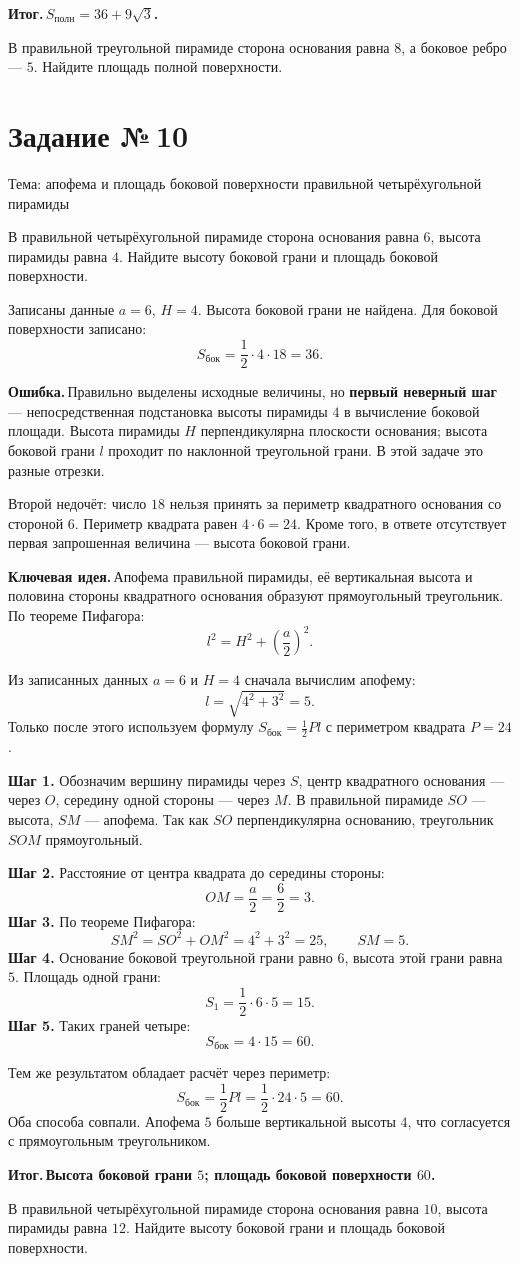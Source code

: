 \documentclass[a4paper,12pt]{article}
\newcommand{\keyidea}{\textcolor{darkaccent}{\textbf{Ключевая идея.}}\,}
\newcommand{\errorlead}{\textcolor{alert}{\textbf{Ошибка.}}\,}
\newcommand{\outcome}{\textcolor{darkaccent}{\textbf{Итог.}}\,}
\newcommand{\parthead}[1]{\par\vspace{4pt}{\bfseries\textcolor{ink}{#1}}\par\vspace{1pt}}
\newcommand{\taskhead}[2]{\phantomsection\label{task:#1}\section*{Задание №\,#1}\textcolor{muted}{#2}\par\smallskip}
\begin{document}
\outcome \textbf{$S_{\text{полн}}=36+9\sqrt3$.}

\parthead{Задача на закрепление}
В правильной треугольной пирамиде сторона основания равна $8$, а боковое ребро --- $5$. Найдите площадь полной поверхности.

\newpage
\taskhead{10}{Тема: апофема и площадь боковой поверхности правильной четырёхугольной пирамиды}
\parthead{Условие}
В правильной четырёхугольной пирамиде сторона основания равна $6$, высота пирамиды равна $4$. Найдите высоту боковой грани и площадь боковой поверхности.

\parthead{Ваше решение и ответ}
Записаны данные $a=6$, $H=4$. Высота боковой грани не найдена. Для боковой поверхности записано:
\[
S_{\text{бок}}=\frac12\cdot4\cdot18=36.
\]

\parthead{Где возникает ошибка}
\errorlead Правильно выделены исходные величины, но \textbf{первый неверный шаг} --- непосредственная подстановка высоты пирамиды $4$ в вычисление боковой площади. Высота пирамиды $H$ перпендикулярна плоскости основания; высота боковой грани $l$ проходит по наклонной треугольной грани. В этой задаче это разные отрезки.

Второй недочёт: число $18$ нельзя принять за периметр квадратного основания со стороной $6$. Периметр квадрата равен $4\cdot6=24$. Кроме того, в ответе отсутствует первая запрошенная величина --- высота боковой грани.

\parthead{Ключевая идея}
\keyidea Апофема правильной пирамиды, её вертикальная высота и половина стороны квадратного основания образуют прямоугольный треугольник. По теореме Пифагора:
\[
l^2=H^2+\left(\frac a2\right)^2.
\]

\parthead{Исправление от правильного шага}
Из записанных данных $a=6$ и $H=4$ сначала вычислим апофему:
\[
l=\sqrt{4^2+3^2}=5.
\]
Только после этого используем формулу $S_{\text{бок}}=\frac12Pl$ с периметром квадрата $P=24$.

\parthead{Полное правильное решение}
\textbf{Шаг 1.} Обозначим вершину пирамиды через $S$, центр квадратного основания --- через $O$, середину одной стороны --- через $M$. В правильной пирамиде $SO$ --- высота, $SM$ --- апофема. Так как $SO$ перпендикулярна основанию, треугольник $SOM$ прямоугольный.

\textbf{Шаг 2.} Расстояние от центра квадрата до середины стороны:
\[
OM=\frac a2=\frac62=3.
\]
\textbf{Шаг 3.} По теореме Пифагора:
\[
SM^2=SO^2+OM^2=4^2+3^2=25,
\qquad SM=5.
\]
\textbf{Шаг 4.} Основание боковой треугольной грани равно $6$, высота этой грани равна $5$. Площадь одной грани:
\[
S_1=\frac12\cdot6\cdot5=15.
\]
\textbf{Шаг 5.} Таких граней четыре:
\[
S_{\text{бок}}=4\cdot15=60.
\]

\parthead{Проверка}
Тем же результатом обладает расчёт через периметр:
\[
S_{\text{бок}}=\frac12Pl=\frac12\cdot24\cdot5=60.
\]
Оба способа совпали. Апофема $5$ больше вертикальной высоты $4$, что согласуется с прямоугольным треугольником.

\outcome \textbf{Высота боковой грани $5$; площадь боковой поверхности $60$.}

\parthead{Задача на закрепление}
В правильной четырёхугольной пирамиде сторона основания равна $10$, высота пирамиды равна $12$. Найдите высоту боковой грани и площадь боковой поверхности.
\end{document}
